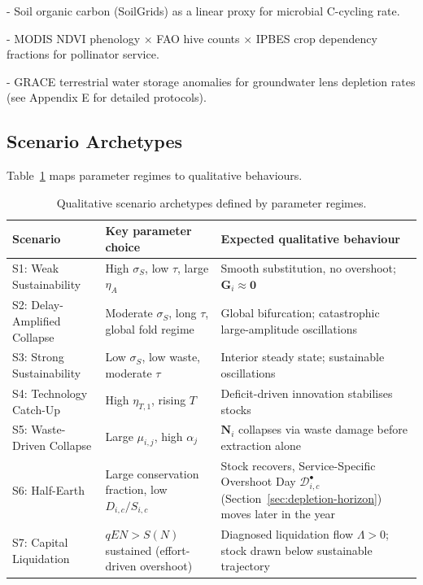 \documentclass[twocolumn,10pt]{article}
\begin{document}
- Soil organic carbon (SoilGrids) as a linear proxy for microbial C-cycling rate.

- MODIS NDVI phenology × FAO hive counts × IPBES crop dependency fractions for pollinator service.

- GRACE terrestrial water storage anomalies for groundwater lens depletion rates (see Appendix E for detailed protocols).

\subsection{Scenario Archetypes}
Table~\ref{tab:scenarios} maps parameter regimes to qualitative behaviours.
\begin{table}[t]
\centering
\caption{Qualitative scenario archetypes defined by parameter regimes.}
\label{tab:scenarios}
\begin{tabular}{p{3cm}p{6cm}p{7cm}}
\toprule
\textbf{Scenario} & \textbf{Key parameter choice} & \textbf{Expected qualitative behaviour} \\
\midrule
S1: Weak Sustainability & High \(\sigma_S\), low \(\tau\), large \(\eta_A\) &
      Smooth substitution, no overshoot; \(\mathbf{G}_i\approx \mathbf{0}\) \\
S2: Delay-Amplified Collapse & Moderate \(\sigma_S\), long \(\tau\), global fold regime &
      Global bifurcation; catastrophic large-amplitude oscillations \\
S3: Strong Sustainability & Low \(\sigma_S\), low waste, moderate \(\tau\) &
      Interior steady state; sustainable oscillations \\
S4: Technology Catch-Up & High \(\eta_{T,1}\), rising \(T\) &
      Deficit-driven innovation stabilises stocks \\
S5: Waste-Driven Collapse & Large \(\mu_{i,j}\), high \(\alpha_j\) &
      \(\mathbf{N}_i\) collapses via waste damage before extraction alone \\
S6: Half-Earth & Large conservation fraction, low \(D_{i,c}/S_{i,c}\) &
      Stock recovers, Service-Specific Overshoot Day $\mathcal{D}^{\bullet}_{i,c}$ (Section~\ref{sec:depletion-horizon}) moves later in the year \\
S7: Capital Liquidation & \(qEN > S(N)\) sustained (effort-driven overshoot) &
      Diagnosed liquidation flow $\Lambda>0$; stock drawn below sustainable trajectory \\
\bottomrule
\end{tabular}
\end{table}
\end{document}
